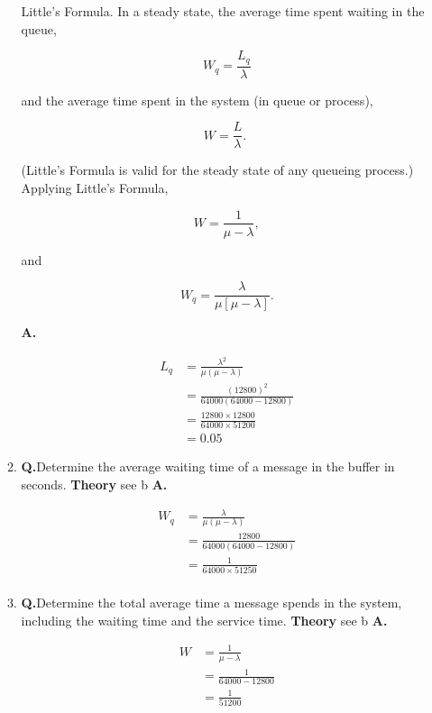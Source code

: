 \documentclass[main.tex]{subfiles}
\begin{document}
\begin{enumerate}
\begin{enumerate}
        Little's Formula. In a steady state, the average time spent waiting in the queue,
        
        $$
        W_q=\frac{L_q}{\lambda}
        $$
        
        and the average time spent in the system (in queue or process),
        
        $$
        W=\frac{L}{\lambda} \text {. }
        $$
        
        (Little's Formula is valid for the steady state of any queueing process.) Applying Little's Formula,
        
        $$
        W=\frac{1}{\mu-\lambda},
        $$
        
        and
        
        $$
        W_q=\frac{\lambda}{\mu[\mu-\lambda]}.
        $$

        \textbf{A.}

        $$
        \begin{aligned}
        L_q & = \frac{\lambda^2}{\mu(\mu-\lambda)} \\
        & = \frac{(12800)^2}{64000(64000-12800)} \\
        & = \frac{12800 \times 12800}{64000 \times 51200} \\
        & = 0.05
        \end{aligned}
        $$
        
        \item \textbf{Q.}Determine the average waiting time of a message in the buffer in seconds. \textbf{Theory} see b \textbf{A.} 
        
        $$
        \begin{aligned}
        W_q & =\frac{\lambda}{\mu(\mu-\lambda)} \\
        & =\frac{12800}{64000(64000-12800)} \\
        & =\frac{1}{64000 \times 51250} \\
        \end{aligned}
        $$
        
        \item \textbf{Q.}Determine the total average time a message spends in the system, including the waiting time and the service time. \textbf{Theory} see b \textbf{A.} 
        
        $$
        \begin{aligned}
        W &= \frac{1}{\mu-\lambda}\\
        &= \frac{1}{64000-12800} \\
        &= \frac{1}{51200}
        \end{aligned}
        $$
        

\end{enumerate}
\end{enumerate}
\end{document}
